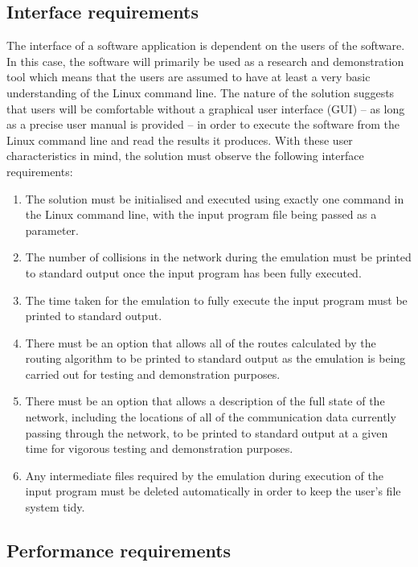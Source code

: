 \documentclass[a4paper, 12pt]{article}
\begin{document}
\subsection{Interface requirements}

The interface of a software application is dependent on the users of the software. In this case, the software will primarily be used as a research and demonstration tool which means that the users are assumed to have at least a very basic understanding of the Linux command line. The nature of the solution suggests that users will be comfortable without a graphical user interface (GUI) -- as long as a precise user manual is provided -- in order to execute the software from the Linux command line and read the results it produces. With these user characteristics in mind, the solution must observe the following interface requirements:
\begin{enumerate}[leftmargin=*,labelindent=15pt,label=\bfseries 2.\arabic*] 
	\item The solution must be initialised and executed using exactly one command in the Linux command line, with the input program file being passed as a parameter. 
	\item The number of collisions in the network during the emulation must be printed to standard output once the input program has been fully executed.
	\item The time taken for the emulation to fully execute the input program must be printed to standard output.
	\item There must be an option that allows all of the routes calculated by the routing algorithm to be printed to standard output as the emulation is being carried out for testing and demonstration purposes.
	\item There must be an option that allows a description of the full state of the network, including the locations of all of the communication data currently passing through the network, to be printed to standard output at a given time for vigorous testing and demonstration purposes.
	\item Any intermediate files required by the emulation during execution of the input program must be deleted automatically in order to keep the user's file system tidy.
\end{enumerate}

\subsection{Performance requirements}
\end{document}
